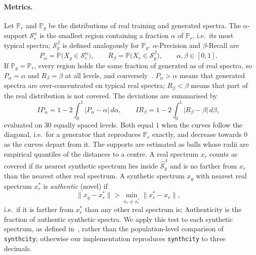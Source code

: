 \documentclass[12pt]{article}
\theoremstyle{paper}
\begin{document}
\paragraph{Metrics.}
Let $\mathbb{P}_r$ and $\mathbb{P}_g$ be the distributions of real training and generated spectra.
The $\alpha$-support $\mathcal{S}_r^{\alpha}$ is the smallest region containing a fraction $\alpha$
of $\mathbb{P}_r$, i.e.\ its most typical spectra; $\mathcal{S}_g^{\beta}$ is defined analogously
for $\mathbb{P}_g$. $\alpha$-Precision and $\beta$-Recall are
\begin{equation}
P_\alpha=\mathbb{P}\bigl(X_g\in\mathcal{S}_r^{\alpha}\bigr),\qquad
R_\beta=\mathbb{P}\bigl(X_r\in\mathcal{S}_g^{\beta}\bigr),\qquad \alpha,\beta\in[0,1].
\end{equation}
If $\mathbb{P}_g=\mathbb{P}_r$, every region holds the same fraction of generated as of real
spectra, so $P_\alpha=\alpha$ and $R_\beta=\beta$ at all levels, and conversely~\cite{pmlr-v162-alaa22a}.
$P_\alpha>\alpha$ means that generated spectra are over-concentrated on typical real spectra;
$R_\beta<\beta$ means that part of the real distribution is not covered. The deviations are
summarised by
\begin{equation}
IP_\alpha=1-2\int_0^1\lvert P_\alpha-\alpha\rvert\,d\alpha,\qquad
IR_\beta=1-2\int_0^1\lvert R_\beta-\beta\rvert\,d\beta,
\end{equation}
evaluated on 30 equally spaced levels. Both equal $1$ when the curves follow the diagonal, i.e.\
for a generator that reproduces $\mathbb{P}_r$ exactly, and decrease towards $0$ as the curves
depart from it. The supports are estimated as balls whose radii are empirical quantiles of the
distances to a centre. A real spectrum $x_r$ counts as covered if its nearest synthetic spectrum
lies inside $\hat{\mathcal{S}}_g^{\beta}$ and is no farther from $x_r$ than the nearest other real
spectrum. A synthetic spectrum $x_g$ with nearest real spectrum $x_r^{*}$ is \emph{authentic}
(novel) if
\begin{equation}
\lVert x_g-x_r^{*}\rVert>\min_{x_r\neq x_r^{*}}\lVert x_r^{*}-x_r\rVert ,
\end{equation}
i.e.\ if it is farther from $x_r^{*}$ than any other real spectrum is; Authenticity is the
fraction of authentic synthetic spectra. We apply this test to each synthetic spectrum, as defined
in~\cite{pmlr-v162-alaa22a}, rather than the population-level comparison of \texttt{synthcity};
otherwise our implementation reproduces \texttt{synthcity} to three decimals.
\end{document}
